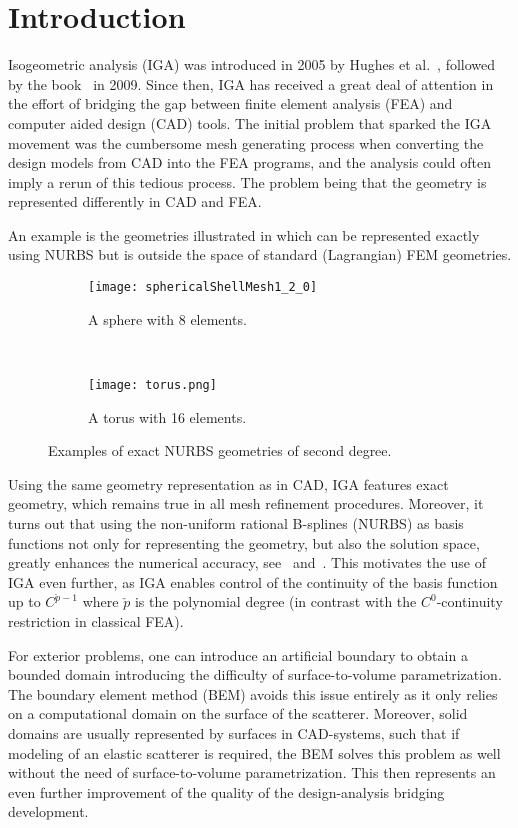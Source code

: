 \section{Introduction}
Isogeometric analysis (IGA) was introduced in 2005 by Hughes et al.~\cite{Hughes2005iac}, followed by the book~\cite{Cottrell2009iat} in 2009. Since then, IGA has received a great deal of attention in the effort of bridging the gap between finite element analysis (FEA) and computer aided design (CAD) tools. The initial problem that sparked the IGA movement was the cumbersome mesh generating process when converting the design models from CAD into the FEA programs, and the analysis could often imply a rerun of this tedious process. The problem being that the geometry is represented differently in CAD and FEA. 

An example is the geometries illustrated in  which can be represented exactly using NURBS but is outside the space of standard (Lagrangian) FEM geometries.
\begin{figure}
	\centering
	\begin{subfigure}[b]{0.3\textwidth}
		\centering
		\texttt{[image: sphericalShellMesh1\_2\_0]}
		\caption{A sphere with 8 elements.}
		\label{Fig3:sphere}
	\end{subfigure}
	~    
	\begin{subfigure}[b]{0.35\textwidth}
		\centering
		\texttt{[image: torus.png]}
		\caption{A torus with 16 elements.}
		\label{Fig3:Torus}
	\end{subfigure}
	\caption{Examples of exact NURBS geometries of second degree.}
	\label{Fig3:NURBSexamples}
\end{figure} 
Using the same geometry representation as in CAD, IGA features exact geometry, which remains true in all mesh refinement procedures. Moreover, it turns out that using the non-uniform rational B-splines (NURBS) as basis functions not only for representing the geometry, but also the solution space, greatly enhances the numerical accuracy, see~\cite{BeiraodaVeiga2011sef} and~\cite{BeiraodaVeiga2014mao}. This motivates the use of IGA even further, as IGA enables control of the continuity of the basis function up to $C^{\check{p}-1}$ where $\check{p}$ is the polynomial degree (in contrast with the $C^0$-continuity restriction in classical FEA). 

For exterior problems, one can introduce an artificial boundary to obtain a bounded domain introducing the difficulty of surface-to-volume parametrization. The boundary element method (BEM) avoids this issue entirely as it only relies on a computational domain on the surface of the scatterer. Moreover, solid domains are usually represented by surfaces in CAD-systems, such that if modeling of an elastic scatterer is required, the BEM solves this problem as well without the need of surface-to-volume parametrization. This then represents an even further improvement of the quality of the design-analysis bridging development.

